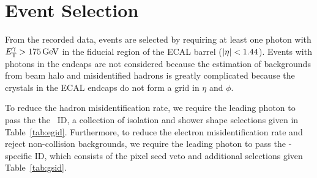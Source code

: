 \section{Event Selection}
\label{sec:event_selection}

From the recorded data, events are selected by requiring at least one photon with $E_{\mathrm{T}}^{\gamma} > 175\,\text{Ge\hspace{-.08em}V}$ in the fiducial region of the ECAL barrel ($\lvert \eta \rvert < 1.44$).
Events with photons in the endcaps are not considered because the estimation of backgrounds from beam halo and misidentified hadrons is greatly complicated because the crystals in the ECAL endcaps do not form a grid in $\eta$ and $\phi$.

To reduce the hadron misidentification rate, we require the leading photon to pass the the \egamma\ ID, a collection of isolation and shower shape selections given in Table~\ref{tab:egid}.
Furthermore, to reduce the electron misidentification rate and reject non-collision backgrounds, we require the leading photon to pass the \Pgg-specific ID, which consists of the pixel seed veto and additional selections given Table~\ref{tab:gsid}.

